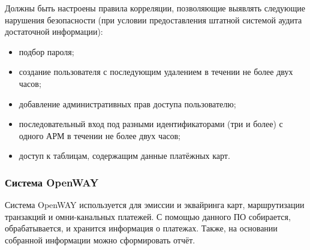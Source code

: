 Должны быть настроены правила корреляции, позволяющие выявлять следующие нарушения безопасности (при условии предоставления штатной системой аудита достаточной информации):
\begin{itemize}
    \item подбор пароля;
    \item создание пользователя с последующим удалением в течении не более двух часов;
    \item добавление административных прав доступа пользователю;
    \item последовательный вход под разными идентификаторами (три и более) с одного АРМ в течении не более двух часов;
    \item доступ к таблицам, содержащим данные платёжных карт.
\end{itemize}

\subsubsection{Система OpenWAY}
Система OpenWAY используется для эмиссии и эквайринга карт, маршрутизации транзакций и омни-канальных платежей. С помощью данного ПО собирается, обрабатывается, и хранится информация о платежах. Также, на основании собранной информации можно сформировать отчёт.

